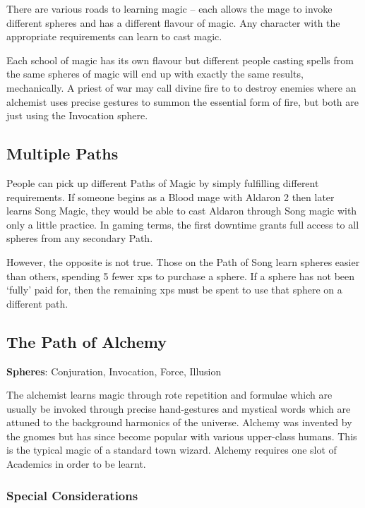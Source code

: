 \begin{multicols}{2}

\noindent
There are various roads to learning magic -- each allows the mage to invoke different spheres and has a different flavour of magic.
Any character with the appropriate requirements can learn to cast magic.

Each school of magic has its own flavour but different people casting spells from the same spheres of magic will end up with exactly the same results, mechanically.
A priest of war may call divine fire to to destroy enemies where an alchemist uses precise gestures to summon the essential form of fire, but both are just using the Invocation sphere.

\subsection{Multiple Paths}

People can pick up different Paths of Magic by simply fulfilling different requirements.
If someone begins as a Blood mage with Aldaron 2 then later learns Song Magic, they would be able to cast Aldaron through Song magic with only a little practice.
In gaming terms, the first \gls{downtime} grants full access to all spheres from any secondary Path.

However, the opposite is not true.
Those on the Path of Song learn spheres easier than others, spending 5 fewer \glspl{xp} to purchase a sphere.
If a sphere has not been `fully' paid for, then the remaining \glspl{xp} must be spent to use that sphere on a different path.

\subsection{The Path of Alchemy}

\noindent\textbf{Spheres}: Conjuration, Invocation, Force, Illusion

\noindent The alchemist learns magic through rote repetition and formulae which are usually be invoked through precise hand-gestures and mystical words which are attuned to the background harmonics of the universe.  Alchemy was invented by the gnomes but has since become popular with various upper-class humans. This is the typical magic of a standard town wizard. Alchemy requires one slot of Academics in order to be learnt.

\subsubsection{Special Considerations}


\end{multicols}
